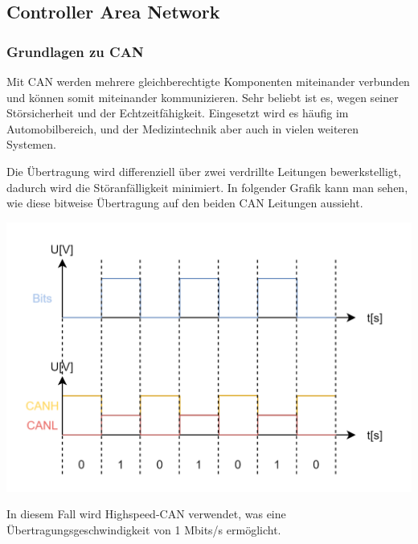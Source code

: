 \documentclass[paper=a4, 12pt]{scrreprt}
\begin{document}
		\subsection{Controller Area Network}\hfill \break
			\subsubsection{Grundlagen zu CAN}\hfill \break
			Mit CAN werden mehrere gleichberechtigte Komponenten miteinander verbunden und können somit miteinander kommunizieren. Sehr beliebt ist es, wegen seiner Störsicherheit und der Echtzeitfähigkeit. Eingesetzt wird es häufig im Automobilbereich, und der Medizintechnik aber auch in vielen weiteren Systemen.
			
			Die Übertragung wird differenziell über zwei verdrillte Leitungen bewerkstelligt, dadurch wird die Störanfälligkeit minimiert. In folgender Grafik kann man sehen, wie diese bitweise Übertragung auf den beiden CAN Leitungen aussieht.
			\begin{adjustbox}{center,caption={CAN Übertragung},label={fig:CANbits.png},nofloat=figure,vspace=\bigskipamount}
				\includegraphics[width=\textwidth]{img/CAN_bits.png}
			\end{adjustbox}
		
			In diesem Fall wird Highspeed-CAN verwendet, was eine Übertragungsgeschwindigkeit von 1 Mbits/s ermöglicht.
			\newpage
			
\end{document}
